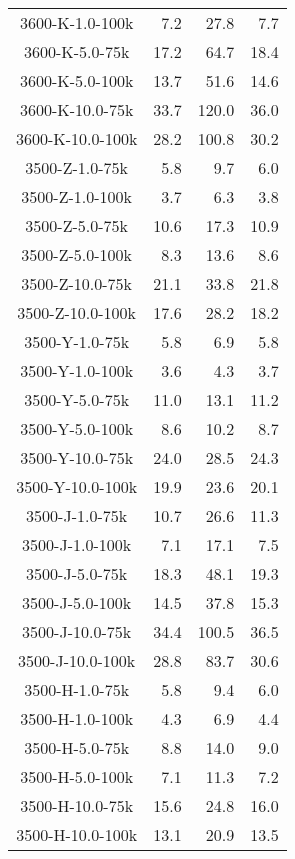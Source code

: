 \begin{longtable}{crrr}
    3600-K-1.0-100k  &    7.2 &   27.8 &    7.7 \\
    3600-K-5.0-75k   &   17.2 &   64.7 &   18.4 \\
    3600-K-5.0-100k  &   13.7 &   51.6 &   14.6 \\
    3600-K-10.0-75k  &   33.7 &  120.0 &   36.0 \\
    3600-K-10.0-100k &   28.2 &  100.8 &   30.2 \\
    3500-Z-1.0-75k   &    5.8 &    9.7 &    6.0 \\
    3500-Z-1.0-100k  &    3.7 &    6.3 &    3.8 \\
    3500-Z-5.0-75k   &   10.6 &   17.3 &   10.9 \\
    3500-Z-5.0-100k  &    8.3 &   13.6 &    8.6 \\
    3500-Z-10.0-75k  &   21.1 &   33.8 &   21.8 \\
    3500-Z-10.0-100k &   17.6 &   28.2 &   18.2 \\
    3500-Y-1.0-75k   &    5.8 &    6.9 &    5.8 \\
    3500-Y-1.0-100k  &    3.6 &    4.3 &    3.7 \\
    3500-Y-5.0-75k   &   11.0 &   13.1 &   11.2 \\
    3500-Y-5.0-100k  &    8.6 &   10.2 &    8.7 \\
    3500-Y-10.0-75k  &   24.0 &   28.5 &   24.3 \\
    3500-Y-10.0-100k &   19.9 &   23.6 &   20.1 \\
    3500-J-1.0-75k   &   10.7 &   26.6 &   11.3 \\
    3500-J-1.0-100k  &    7.1 &   17.1 &    7.5 \\
    3500-J-5.0-75k   &   18.3 &   48.1 &   19.3 \\
    3500-J-5.0-100k  &   14.5 &   37.8 &   15.3 \\
    3500-J-10.0-75k  &   34.4 &  100.5 &   36.5 \\
    3500-J-10.0-100k &   28.8 &   83.7 &   30.6 \\
    3500-H-1.0-75k   &    5.8 &    9.4 &    6.0 \\
    3500-H-1.0-100k  &    4.3 &    6.9 &    4.4 \\
    3500-H-5.0-75k   &    8.8 &   14.0 &    9.0 \\
    3500-H-5.0-100k  &    7.1 &   11.3 &    7.2 \\
    3500-H-10.0-75k  &   15.6 &   24.8 &   16.0 \\
    3500-H-10.0-100k &   13.1 &   20.9 &   13.5 \\

\end{longtable}
